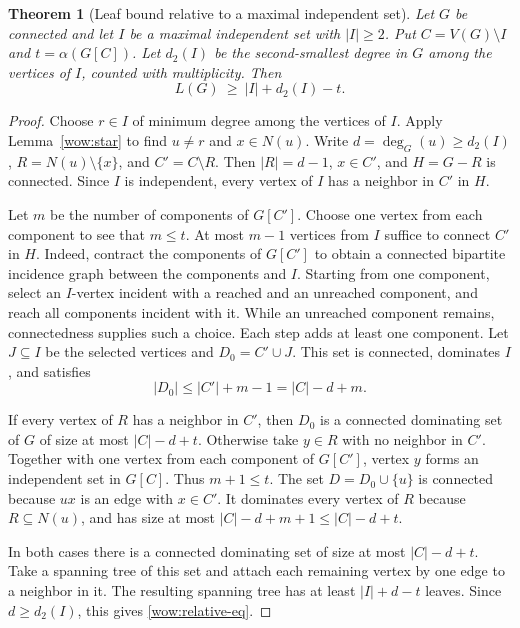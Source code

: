\documentclass[11pt,a4paper]{article}
\newtheorem{theorem}{Theorem}[section]
\theoremstyle{definition}
\theoremstyle{remark}
\numberwithin{equation}{section}
\begin{document}
\begin{theorem}[Leaf bound relative to a maximal independent set]
\label{wow:relative}
Let $G$ be connected and let $I$ be a maximal independent set with
$|I|\ge2$. Put $C=V(G)\setminus I$ and $t=\alpha(G[C])$.
Let $d_2(I)$ be the second-smallest degree in $G$ among the vertices
of $I$, counted with multiplicity. Then
\begin{equation}\label{wow:relative-eq}
 L(G)\ \ge\ |I|+d_2(I)-t.
\end{equation}
\end{theorem}
\begin{proof}
Choose $r\in I$ of minimum degree among the vertices of $I$. Apply
Lemma~\ref{wow:star} to find $u\ne r$ and $x\in N(u)$. Write
$d=\deg_G(u)\ge d_2(I)$, $R=N(u)\setminus\{x\}$, and $C'=C\setminus R$.
Then $|R|=d-1$, $x\in C'$, and $H=G-R$ is connected. Since $I$ is
independent, every vertex of $I$ has a neighbor in $C'$ in $H$.

Let $m$ be the number of components of $G[C']$. Choose one vertex
from each component to see that $m\le t$. At most $m-1$ vertices
from $I$ suffice to connect $C'$ in $H$. Indeed, contract the
components of $G[C']$ to obtain a connected bipartite incidence graph
between the components and $I$. Starting from one component, select
an $I$-vertex incident with a reached and an unreached component,
and reach all components incident with it. While an unreached
component remains, connectedness supplies such a choice. Each step
adds at least one component. Let $J\subseteq I$ be the selected
vertices and $D_0=C'\cup J$. This set is connected, dominates $I$,
and satisfies
\[
 |D_0|\le |C'|+m-1=|C|-d+m.
\]

If every vertex of $R$ has a neighbor in $C'$, then $D_0$ is a
connected dominating set of $G$ of size at most $|C|-d+t$. Otherwise
take $y\in R$ with no neighbor in $C'$. Together with one vertex
from each component of $G[C']$, vertex $y$ forms an independent set
in $G[C]$. Thus $m+1\le t$. The set $D=D_0\cup\{u\}$ is connected
because $ux$ is an edge with $x\in C'$. It dominates every vertex
of $R$ because $R\subseteq N(u)$, and has size at most
$|C|-d+m+1\le |C|-d+t$.

In both cases there is a connected dominating set of size at most
$|C|-d+t$. Take a spanning tree of this set and attach each remaining
vertex by one edge to a neighbor in it. The resulting spanning tree
has at least $|I|+d-t$ leaves. Since $d\ge d_2(I)$, this gives
\eqref{wow:relative-eq}.
\end{proof}
\end{document}
